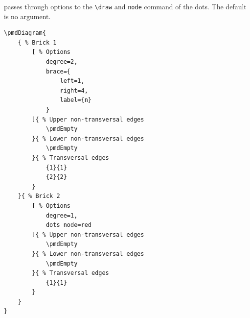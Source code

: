 \documentclass{ltxdoc}
\begin{document}
passes through options to the \verb`\draw` and \verb`node` command of the dots. The default is no argument.
\begin{center}
    \begin{minipage}{\dimexpr0.85\textwidth-2\fboxrule-2\fboxsep\relax}
        \begin{minipage}[c]{0.4\linewidth}
\begin{verbatim}
\pmdDiagram{
    { % Brick 1
        [ % Options
            degree=2,
            brace={
                left=1,
                right=4,
                label={n}
            }
        ]{ % Upper non-transversal edges
            \pmdEmpty
        }{ % Lower non-transversal edges
            \pmdEmpty
        }{ % Transversal edges
            {1}{1}
            {2}{2}
        }
    }{ % Brick 2
        [ % Options
            degree=1,
            dots node=red
        ]{ % Upper non-transversal edges
            \pmdEmpty
        }{ % Lower non-transversal edges
            \pmdEmpty
        }{ % Transversal edges
            {1}{1}
        }
    }
}
\end{verbatim}
        \end{minipage}
        \hfill
        \begin{minipage}[c]{0.4\linewidth}
        \end{minipage}
    \end{minipage}%
\end{center}
\begin{center}
\end{center}
\end{document}
